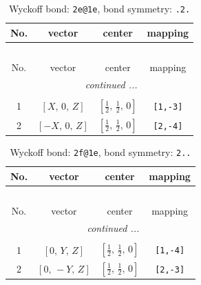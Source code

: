 \documentclass[fleqn,8pt]{jsarticle}
\begin{document}
\renewcommand{\arraystretch}{1.2}
\begin{longtable}{cccc}
\caption{Wyckoff bond: {\tt 2e@1e}, bond symmetry: {\tt .2.}}
 \\
 \hline \hline
No. & vector & center & mapping \\ \hline \endfirsthead

\multicolumn{3}{l}{\tablename\ \thetable{}} \\
 \hline \hline
No. & vector & center & mapping \\ \hline \endhead

 \hline \hline
\multicolumn{3}{r}{\footnotesize\it continued ...} \\ \endfoot

 \hline \hline
\multicolumn{3}{r}{} \\ \endlastfoot

1 & $\left[ X,\, 0,\, Z \right]$ & $\left[ \frac{1}{2},\, \frac{1}{2},\, 0 \right]$ & {\tt [1,-3]} \\ \hline
2 & $\left[ - X,\, 0,\, Z \right]$ & $\left[ \frac{1}{2},\, \frac{1}{2},\, 0 \right]$ & {\tt [2,-4]} \\
\end{longtable}
\renewcommand{\arraystretch}{1.2}
\begin{longtable}{cccc}
\caption{Wyckoff bond: {\tt 2f@1e}, bond symmetry: {\tt 2..}}
 \\
 \hline \hline
No. & vector & center & mapping \\ \hline \endfirsthead

\multicolumn{3}{l}{\tablename\ \thetable{}} \\
 \hline \hline
No. & vector & center & mapping \\ \hline \endhead

 \hline \hline
\multicolumn{3}{r}{\footnotesize\it continued ...} \\ \endfoot

 \hline \hline
\multicolumn{3}{r}{} \\ \endlastfoot

1 & $\left[ 0,\, Y,\, Z \right]$ & $\left[ \frac{1}{2},\, \frac{1}{2},\, 0 \right]$ & {\tt [1,-4]} \\ \hline
2 & $\left[ 0,\, - Y,\, Z \right]$ & $\left[ \frac{1}{2},\, \frac{1}{2},\, 0 \right]$ & {\tt [2,-3]} \\
\end{longtable}
\renewcommand{\arraystretch}{1.2}
\end{document}
